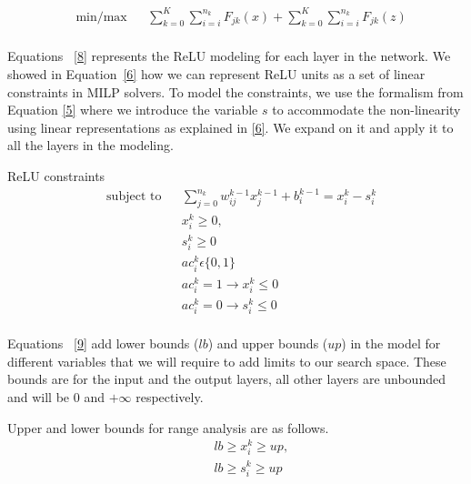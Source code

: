 \begin{equation}
\label{7}
\begin{aligned}
& \underset{}{\text{min/max}}
& &  \sum_{k=0}^{K} \sum_{i=i}^{n_k}F_{jk}(x)   + \sum_{k=0}^{K} \sum_{i=i}^{n_k}F_{jk}(z)  \\
\end{aligned}
\end{equation}


Equations ~\ref{8} represents the ReLU modeling for each layer in the network. 
We showed in Equation~\ref{6} how we can represent ReLU units as a set of linear constraints in \ac{MILP} solvers. 
To model the constraints, we use the formalism from Equation \ref{5} where we introduce the variable $s$ to accommodate the non-linearity using linear representations as explained in \ref{6}. 
We expand on it and apply it to all the layers in the modeling.   
 
ReLU constraints
\begin{equation}
\label{8}
\begin{aligned}
& \text{subject to} & &  \sum_{j=0}^{n_k} w_{ij}^{k-1}x_{j}^{k-1} + b_i^{k-1} = x_i^k - s_i^k  \\
& & & x_i^k \geq 0, \\
& & & s_i^k \geq 0 \\
& & & ac_i^k  \epsilon  \{0,1\} \\
& & & ac_i^k  =  1 \rightarrow  x_i^k \leq 0  \\
& & & ac_i^k =  0 \rightarrow s_i^k  \leq 0   \\
\end{aligned}
\end{equation}

Equations ~\ref{9} add lower bounds ($lb$) and upper bounds ($up$) in the  model for different variables that we will  require to add limits to our search space. 
These bounds are for the input and the output layers, all other layers are unbounded and will be 0 and $+\infty$ respectively. 
 
Upper and lower bounds for range analysis are as follows.
\begin{equation}
\label{9}
\begin{aligned}
& & & lb \geq x_i^k \geq up, \\
& & &  lb \geq s_i^k \geq up \\
\end{aligned}
\end{equation}








